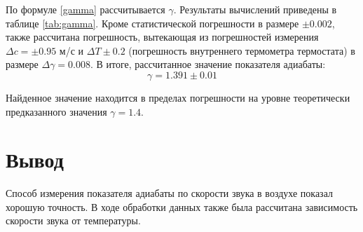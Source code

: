 \documentclass[a4paper,12pt]{article}
\begin{document}
По формуле \eqref{gamma} рассчитывается $ \gamma $. Результаты вычислений приведены в таблице \ref{tab:gamma}. Кроме статистической погрешности в размере $ \pm 0.002$, также рассчитана погрешность, вытекающая из погрешностей измерения $ \Delta c =  \pm 0.95 $ м/с и $ \Delta T  \pm 0.2 $ \textcelsius{} (погрешность внутреннего термометра термостата) в размере $ \Delta \gamma = 0.008 $. В итоге, рассчитанное значение показателя адиабаты:
\begin{equation}
  \boxed{\gamma = 1.391 \pm 0.01}
\end{equation}

Найденное значение находится в пределах погрешности на уровне теоретически предказанного значения $ \gamma = 1.4 $.

\section{Вывод}
Способ измерения показателя адиабаты по скорости звука в воздухе показал хорошую точность. В ходе обработки данных также была рассчитана зависимость скорости звука от температуры.
\end{document}
